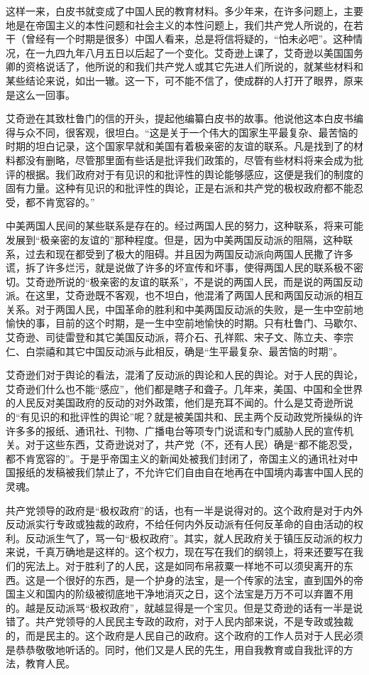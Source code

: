 这样一来，白皮书就变成了中国人民的教育材料。多少年来，在许多问题上，主要地是在帝国主义的本性问题和社会主义的本性问题上，我们共产党人所说的，在若干（曾经有一个时期是很多）中国人看来，总是将信将疑的，“怕未必吧”。这种情况，在一九四九年八月五日以后起了一个变化。艾奇逊上课了，艾奇逊以美国国务卿的资格说话了，他所说的和我们共产党人或其它先进人们所说的，就某些材料和某些结论来说，如出一辙。这一下，可不能不信了，使成群的人打开了眼界，原来是这么一回事。

艾奇逊在其致杜鲁门的信的开头，提起他编纂白皮书的故事。他说他这本白皮书编得与众不同，很客观，很坦白。“这是关于一个伟大的国家生平最复杂、最苦恼的时期的坦白记录，这个国家早就和美国有着极亲密的友谊的联系。凡是找到了的材料都没有删略，尽管那里面有些话是批评我们政策的，尽管有些材料将来会成为批评的根据。我们政府对于有见识的和批评性的舆论能够感应，这便是我们的制度的固有力量。这种有见识的和批评性的舆论，正是右派和共产党的极权政府都不能忍受，都不肯宽容的。”

中美两国人民间的某些联系是存在的。经过两国人民的努力，这种联系，将来可能发展到“极亲密的友谊的”那种程度。但是，因为中美两国反动派的阻隔，这种联系，过去和现在都受到了极大的阻碍。并且因为两国反动派向两国人民撒了许多谎，拆了许多烂污，就是说做了许多的坏宣传和坏事，使得两国人民的联系极不密切。艾奇逊所说的“极亲密的友谊的联系”，不是说的两国人民，而是说的两国反动派。在这里，艾奇逊既不客观，也不坦白，他混淆了两国人民和两国反动派的相互关系。对于两国人民，中国革命的胜利和中美两国反动派的失败，是一生中空前地愉快的事，目前的这个时期，是一生中空前地愉快的时期。只有杜鲁门、马歇尔、艾奇逊、司徒雷登和其它美国反动派，蒋介石、孔祥熙、宋子文、陈立夫、李宗仁、白崇禧和其它中国反动派与此相反，确是“生平最复杂、最苦恼的时期”。

艾奇逊们对于舆论的看法，混淆了反动派的舆论和人民的舆论。对于人民的舆论，艾奇逊们什么也不能“感应”，他们都是瞎子和聋子。几年来，美国、中国和全世界的人民反对美国政府的反动的对外政策，他们是充耳不闻的。什么是艾奇逊所说的“有见识的和批评性的舆论”呢？就是被美国共和、民主两个反动政党所操纵的许许多多的报纸、通讯社、刊物、广播电台等项专门说谎和专门威胁人民的宣传机关。对于这些东西，艾奇逊说对了，共产党（不，还有人民）确是“都不能忍受，都不肯宽容的”。于是乎帝国主义的新闻处被我们封闭了，帝国主义的通讯社对中国报纸的发稿被我们禁止了，不允许它们自由自在地再在中国境内毒害中国人民的灵魂。

共产党领导的政府是“极权政府”的话，也有一半是说得对的。这个政府是对于内外反动派实行专政或独裁的政府，不给任何内外反动派有任何反革命的自由活动的权利。反动派生气了，骂一句“极权政府”。其实，就人民政府关于镇压反动派的权力来说，千真万确地是这样的。这个权力，现在写在我们的纲领上，将来还要写在我们的宪法上。对于胜利了的人民，这是如同布帛菽粟一样地不可以须臾离开的东西。这是一个很好的东西，是一个护身的法宝，是一个传家的法宝，直到国外的帝国主义和国内的阶级被彻底地干净地消灭之日，这个法宝是万万不可以弃置不用的。越是反动派骂“极权政府”，就越显得是一个宝贝。但是艾奇逊的话有一半是说错了。共产党领导的人民民主专政的政府，对于人民内部来说，不是专政或独裁的，而是民主的。这个政府是人民自己的政府。这个政府的工作人员对于人民必须是恭恭敬敬地听话的。同时，他们又是人民的先生，用自我教育或自我批评的方法，教育人民。

